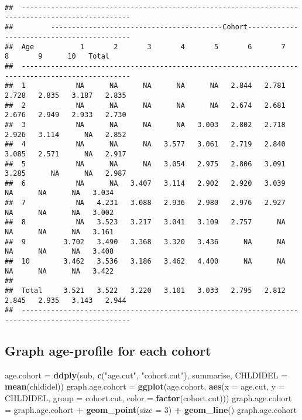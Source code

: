 \documentclass[]{article}
\newenvironment{Shaded}{\begin{snugshade}}{\end{snugshade}}
\newcommand{\DataTypeTok}[1]{\textcolor[rgb]{0.13,0.29,0.53}{#1}}
\newcommand{\DecValTok}[1]{\textcolor[rgb]{0.00,0.00,0.81}{#1}}
\newcommand{\KeywordTok}[1]{\textcolor[rgb]{0.13,0.29,0.53}{\textbf{#1}}}
\newcommand{\NormalTok}[1]{#1}
\newcommand{\OperatorTok}[1]{\textcolor[rgb]{0.81,0.36,0.00}{\textbf{#1}}}
\newcommand{\StringTok}[1]{\textcolor[rgb]{0.31,0.60,0.02}{#1}}
\begin{document}
\begin{verbatim}
##  ------------------------------------------------------------------------------------------------ 
##         -----------------------------------------Cohort------------------------------------------ 
##  Age           1       2       3       4       5       6       7       8       9      10   Total  
##  ------------------------------------------------------------------------------------------------ 
##  1            NA      NA      NA      NA      NA   2.844   2.781   2.728   2.835   3.187   2.835  
##  2            NA      NA      NA      NA      NA   2.674   2.681   2.676   2.949   2.933   2.730  
##  3            NA      NA      NA      NA   3.003   2.802   2.718   2.926   3.114      NA   2.852  
##  4            NA      NA      NA   3.577   3.061   2.719   2.840   3.085   2.571      NA   2.917  
##  5            NA      NA      NA   3.054   2.975   2.806   3.091   3.285      NA      NA   2.987  
##  6            NA      NA   3.407   3.114   2.902   2.920   3.039      NA      NA      NA   3.034  
##  7            NA   4.231   3.088   2.936   2.980   2.976   2.927      NA      NA      NA   3.002  
##  8            NA   3.523   3.217   3.041   3.109   2.757      NA      NA      NA      NA   3.161  
##  9         3.702   3.490   3.368   3.320   3.436      NA      NA      NA      NA      NA   3.408  
##  10        3.462   3.536   3.186   3.462   4.400      NA      NA      NA      NA      NA   3.422  
##                                                                                                   
##  Total     3.521   3.522   3.220   3.101   3.033   2.795   2.812   2.845   2.935   3.143   2.944  
##  ------------------------------------------------------------------------------------------------
\end{verbatim}

\hypertarget{graph-age-profile-for-each-cohort}{%
\subsection{Graph age-profile for each
cohort}\label{graph-age-profile-for-each-cohort}}

\begin{Shaded}
\begin{Highlighting}[]
\NormalTok{age.cohort =}\StringTok{ }\KeywordTok{ddply}\NormalTok{(sub, }\KeywordTok{c}\NormalTok{(}\StringTok{"age.cut"}\NormalTok{, }\StringTok{"cohort.cut"}\NormalTok{), summarise, }\DataTypeTok{CHLDIDEL =} \KeywordTok{mean}\NormalTok{(chldidel))}
\NormalTok{graph.age.cohort =}\StringTok{ }\KeywordTok{ggplot}\NormalTok{(age.cohort, }\KeywordTok{aes}\NormalTok{(}\DataTypeTok{x =}\NormalTok{ age.cut, }\DataTypeTok{y =}\NormalTok{ CHLDIDEL, }\DataTypeTok{group =}\NormalTok{ cohort.cut, }\DataTypeTok{color =} \KeywordTok{factor}\NormalTok{(cohort.cut)))}
\NormalTok{graph.age.cohort =}\StringTok{ }\NormalTok{graph.age.cohort }\OperatorTok{+}\StringTok{ }\KeywordTok{geom_point}\NormalTok{(}\DataTypeTok{size =} \DecValTok{3}\NormalTok{) }\OperatorTok{+}\StringTok{ }\KeywordTok{geom_line}\NormalTok{()}
\NormalTok{graph.age.cohort}
\end{Highlighting}
\end{Shaded}
\end{document}
